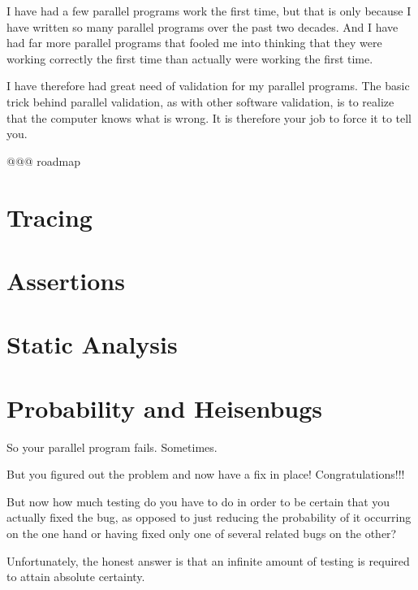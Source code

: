 

I have had a few parallel programs work the first time, but that is only
because I have written so many parallel programs over the past two decades.
And I have had far more parallel programs that fooled me into thinking
that they were working correctly the first time than actually were working
the first time.

I have therefore had great need of validation for my parallel programs.
The basic trick behind parallel validation, as with other software
validation, is to realize that the computer knows what is wrong.
It is therefore your job to force it to tell you.

@@@ roadmap

\section{Tracing}
\label{sec:debugging:Tracing}

\section{Assertions}
\label{sec:debugging:Assertions}

\section{Static Analysis}
\label{sec:debugging:Static Analysis}

\section{Probability and Heisenbugs}
\label{sec:analysis:Probability and Heisenbugs}

So your parallel program fails.
Sometimes.

But you figured out the problem and now have a fix in place!
Congratulations!!!

But now how much testing do you have to do in order to be certain that
you actually fixed the bug, as opposed to just reducing the probability
of it occurring on the one hand or having fixed only one of several
related bugs on the other?

Unfortunately, the honest answer is that an infinite amount of testing
is required to attain absolute certainty.

